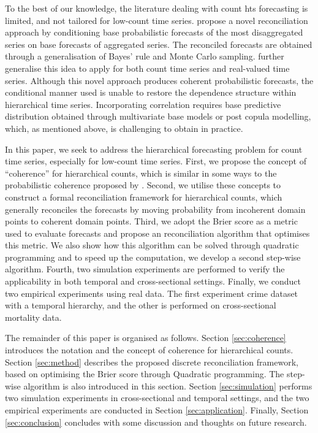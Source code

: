 \documentclass[a4paper,review,12pt,authoryear]{elsarticle}
\begin{document}
To the best of our knowledge, the literature dealing with count hts forecasting is limited, and not tailored for low-count time series.
\cite{coraniProbabilisticReconciliationCount2022} propose a novel reconciliation approach by conditioning base probabilistic forecasts of the most disaggregated series on base forecasts of aggregated series. 
The reconciled forecasts are obtained through a generalisation of Bayes’ rule and Monte Carlo sampling.
\cite{zambonEfficientProbabilisticReconciliation2022} further generalise this idea to apply for both count time series and real-valued time series.
Although this novel approach produces coherent probabilistic forecasts, 
the conditional manner used is unable to restore the dependence structure within hierarchical time series.
Incorporating correlation requires base predictive distribution obtained through multivariate base models or post copula modelling, which, as mentioned above, is challenging to obtain in practice.

In this paper, we seek to address the hierarchical forecasting problem for count time series, especially for low-count time series.
First, we propose the concept of ``coherence'' for hierarchical counts, 
which is similar in some ways to the probabilistic coherence proposed by \cite{panagiotelisProbabilisticForecastReconciliation2022}.
Second, we utilise these concepts to construct a formal reconciliation framework for hierarchical counts, which generally reconciles the forecasts by moving probability from incoherent domain points to coherent domain points.
Third, we adopt the Brier score as a metric used to evaluate forecasts and propose an reconciliation algorithm that optimises this metric. We also show how this algorithm can be solved through quadratic programming and to speed up the computation, we develop a second step-wise algorithm. Fourth, two simulation experiments are performed to verify the applicability  in both temporal and cross-sectional settings. Finally, we conduct two empirical experiments using real data. The first experiment crime dataset with a temporal hierarchy, and the other is performed on cross-sectional mortality data.

The remainder of this paper is organised as follows. 
Section \ref{sec:coherence} introduces the notation and the concept of coherence for hierarchical counts.
Section \ref{sec:method} describes the proposed discrete reconciliation framework, based on optimising the Brier score through Quadratic programming. The step-wise algorithm is also introduced in this section. Section \ref{sec:simulation} performs two simulation experiments in cross-sectional and temporal settings, and the two empirical experiments are conducted in Section \ref{sec:application}. Finally, Section \ref{sec:conclusion} concludes with some discussion and thoughts on future research.
\end{document}
